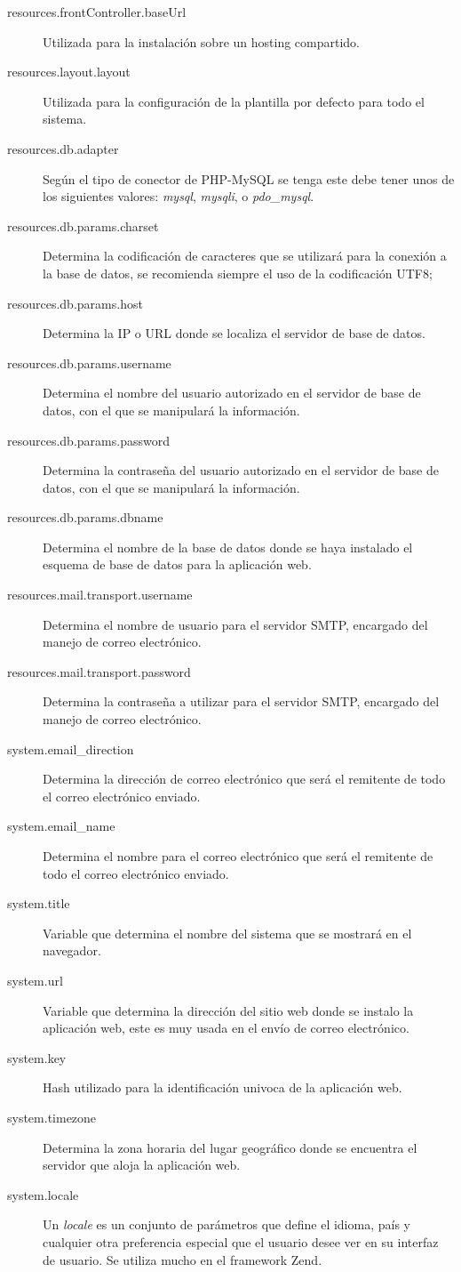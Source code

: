 \begin{description}
\item [resources.frontController.baseUrl] Utilizada para la instalación
sobre un hosting compartido.
\item [resources.layout.layout] Utilizada para la configuración de la
plantilla por defecto para todo el sistema.
\item [resources.db.adapter] Según el tipo de conector de PHP-MySQL se tenga
este debe tener unos de los siguientes valores: \emph{mysql}, \emph{mysqli}, o
\emph{pdo\_mysql}.
\item [resources.db.params.charset] Determina la codificación de caracteres que
se utilizará para la conexión a la base de datos, se recomienda siempre el uso
de la codificación UTF8;
\item [resources.db.params.host] Determina la IP o URL donde se localiza el
servidor de base de datos.
\item [resources.db.params.username] Determina el nombre del usuario autorizado
en el servidor de base de datos, con el que se manipulará la información.
\item [resources.db.params.password] Determina la contraseña del usuario
autorizado en el servidor de base de datos, con el que se manipulará la
información.
\item [resources.db.params.dbname] Determina el nombre de la base de datos donde
se haya instalado el esquema de base de datos para la aplicación web.
\item [resources.mail.transport.username] Determina el nombre de usuario para el
servidor SMTP, encargado del manejo de correo electrónico.
\item [resources.mail.transport.password] Determina la contraseña a utilizar
para el servidor SMTP, encargado del manejo de correo electrónico.
\item [system.email\_direction] Determina la dirección de correo electrónico que
será el remitente de todo el correo electrónico enviado.
\item [system.email\_name] Determina el nombre para el correo electrónico que
será el remitente de todo el correo electrónico enviado.
\item [system.title] Variable que determina el nombre del sistema que se
mostrará en el navegador.
\item [system.url] Variable que determina la dirección del sitio web donde se
instalo la aplicación web, este es muy usada en el envío de correo electrónico.
\item [system.key] Hash utilizado para la identificación univoca de la
aplicación web.
\item [system.timezone] Determina la zona horaria del lugar geográfico donde se
encuentra el servidor que aloja la aplicación web.
\item [system.locale] Un \emph{locale} es un conjunto de parámetros que define
el idioma, país y cualquier otra preferencia especial que el usuario desee ver
en su interfaz de usuario. Se utiliza mucho en el framework Zend.
\end{description}

